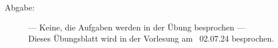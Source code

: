 \documentclass[a4paper,11pt]{scrartcl}
\begin{document}

\begin{description}
\item[Abgabe:] --- Keine, die Aufgaben werden in der Übung besprochen ---\\
Dieses Übungsblatt wird in der Vorlesung am ~02.07.24 besprochen.



\end{description}
\end{document}
